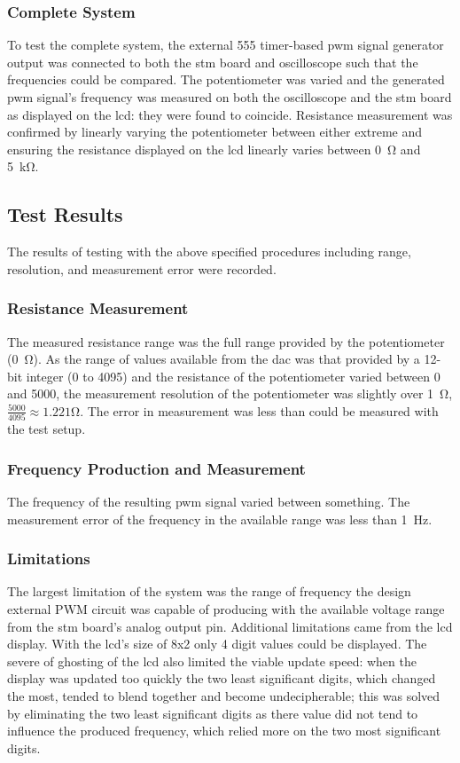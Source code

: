 \subsubsection{Complete System}
To test the complete system, the external 555 timer-based \gls{pwm} signal
generator output was connected to both the \gls{stm} board and oscilloscope
such that the frequencies could be compared. The potentiometer was
varied and the generated \gls{pwm} signal's frequency was measured on
both the oscilloscope and the \gls{stm} board as displayed on the
\gls{lcd}: they were found to coincide. Resistance measurement was
confirmed by linearly varying the potentiometer between either extreme
and ensuring the resistance displayed on the \gls{lcd} linearly varies
between \SI{0}{\ohm} and \SI{5}{\kilo\ohm}.


\subsection{Test Results} The results of testing with the above
specified procedures including range, resolution, and measurement error
were recorded.

\subsubsection{Resistance Measurement}
The measured resistance range was the full range provided by the
potentiometer (\SI{0}{\ohm}). As the range of values available from the
\gls{dac} was that provided by a 12-bit integer (0 to 4095) and the
resistance of the potentiometer varied between 0 and 5000, the
measurement resolution of the potentiometer was slightly over
\SI{1}{\ohm}, $\frac{5000}{4095}\approx1.221$\si{\ohm}. The error in
measurement was less than could be measured with the test setup.

\subsubsection{Frequency Production and Measurement}
The frequency of the resulting \gls{pwm} signal varied between
something. The measurement error of the frequency in the available range
was less than \SI{1}{\hertz}.

\subsubsection{Limitations}
The largest limitation of the system was the range of frequency the
design external PWM circuit was capable of producing with the available
voltage range from the \gls{stm} board's analog output pin. Additional
limitations came from the \gls{lcd} display. With the \gls{lcd}'s size
of 8x2 only 4 digit values could be displayed. The severe of
ghosting of the \gls{lcd} also limited the viable update speed: when the
display was updated too quickly the two least significant digits, which
changed the most, tended to blend together and become undecipherable;
this was solved by eliminating the two least significant digits as there
value did not tend to influence the produced frequency, which relied
more on the two most significant digits.
